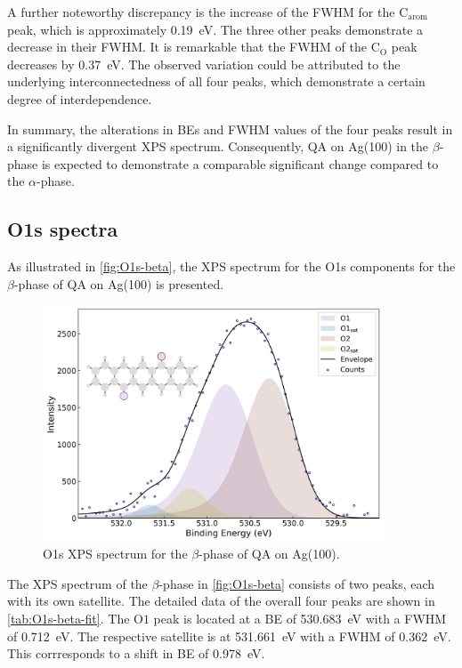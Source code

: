 A further noteworthy discrepancy is the increase of the \ac{FWHM} for the $\mathrm{C_{arom}}$ peak, which is approximately 0.19~\si{\eV}. The three other peaks demonstrate a decrease in their \ac{FWHM}. It is remarkable that the \ac{FWHM} of the $\mathrm{C_{O}}$ peak decreases by 0.37~\si{\eV}. The observed variation could be attributed to the underlying interconnectedness of all four peaks, which demonstrate a certain degree of interdependence.

In summary, the alterations in \acp{BE} and \ac{FWHM} values of the four peaks result in a significantly divergent \ac{XPS} spectrum. Consequently, \ac{QA} on Ag(100) in the $\beta$-phase is expected to demonstrate a comparable significant change compared to the $\alpha$-phase.

\cleardoublepage
\subsection{O1s spectra}

As illustrated in \autoref{fig:O1s-beta}, the \ac{XPS} spectrum for the O1s components for the $\beta$-phase of \ac{QA} on Ag(100) is presented.

\begin{figure}[H]
	\centering
	\includegraphics[width=0.9\textwidth]{images/O1s-beta.png}
	\caption{O1s \ac{XPS} spectrum for the $\beta$-phase of \ac{QA} on Ag(100).}
	\label{fig:O1s-beta}
\end{figure}

The \ac{XPS} spectrum of the $\beta$-phase in \autoref{fig:O1s-beta} consists of two peaks, each with its own satellite. The detailed data of the overall four peaks are shown in \autoref{tab:O1s-beta-fit}. The $\mathrm{O1}$ peak is located at a \ac{BE} of 530.683~\si{\eV} with a \ac{FWHM} of 0.712~\si{\eV}. The respective satellite is at 531.661~\si{\eV} with a \ac{FWHM} of 0.362~\si{\eV}. This corrresponds to a shift in \ac{BE} of 0.978~\si{\eV}.

